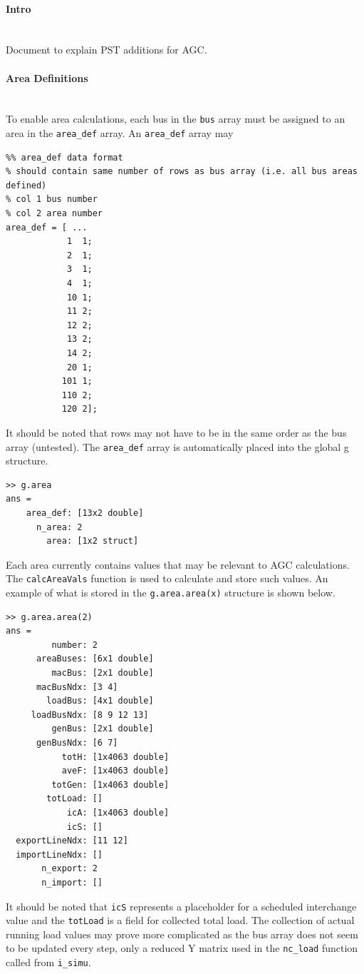 \documentclass[12pt]{article}
\begin{document}
\onehalfspacing
\paragraph{Intro} \ \\
Document to explain PST additions for AGC.


\paragraph{Area Definitions} \ \\
To enable area calculations, each bus  in the \verb|bus| array must be assigned to an area in the \verb|area_def| array.
An \verb|area_def| array may 
\begin{verbatim}
%% area_def data format
% should contain same number of rows as bus array (i.e. all bus areas defined)
% col 1 bus number
% col 2 area number
area_def = [ ...
            1  1;
            2  1;
            3  1;
            4  1;
            10 1;
            11 2;
            12 2;
            13 2;
            14 2; 
            20 1;
           101 1; 
           110 2;
           120 2];
\end{verbatim}

It should be noted that rows may not have to be in the same order as the bus array (untested).
The \verb|area_def| array is automatically placed into the global g structure.
\begin{verbatim}
>> g.area
ans = 
    area_def: [13x2 double]
      n_area: 2
        area: [1x2 struct]
\end{verbatim}

Each area currently contains values that may be relevant to AGC calculations.
The \verb|calcAreaVals| function is used to calculate and store such values.
An example of what is stored in the \verb|g.area.area(x)| structure is shown below.
\begin{verbatim}
>> g.area.area(2)
ans = 
         number: 2
      areaBuses: [6x1 double]
         macBus: [2x1 double]
      macBusNdx: [3 4]
        loadBus: [4x1 double]
     loadBusNdx: [8 9 12 13]
         genBus: [2x1 double]
      genBusNdx: [6 7]
           totH: [1x4063 double]
           aveF: [1x4063 double]
         totGen: [1x4063 double]
        totLoad: []
            icA: [1x4063 double]
            icS: []
  exportLineNdx: [11 12]
  importLineNdx: []
       n_export: 2
       n_import: []
\end{verbatim}
It should be noted that \verb|icS| represents a placeholder for a scheduled interchange value and the \verb|totLoad|  is a field for collected total load.
The collection of actual running load values may prove more complicated as the bus array does not seem to be updated every step, only a reduced Y matrix used in the \verb|nc_load| function called from \verb|i_simu|. 
\end{document}
